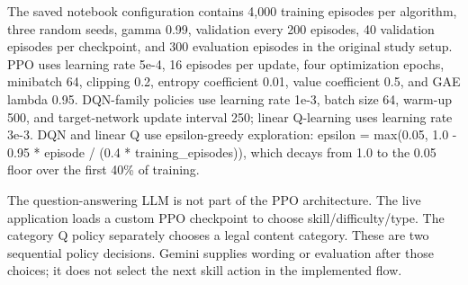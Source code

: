 \documentclass{ieeeaccess}
\begin{document}
The saved notebook configuration contains 4,000 training episodes per algorithm, three random seeds, gamma 0.99, validation every 200 episodes, 40 validation episodes per checkpoint, and 300 evaluation episodes in the original study setup. PPO uses learning rate 5e-4, 16 episodes per update, four optimization epochs, minibatch 64, clipping 0.2, entropy coefficient 0.01, value coefficient 0.5, and GAE lambda 0.95. DQN-family policies use learning rate 1e-3, batch size 64, warm-up 500, and target-network update interval 250; linear Q-learning uses learning rate 3e-3. DQN and linear Q use epsilon-greedy exploration: epsilon = max(0.05, 1.0 - 0.95 * episode / (0.4 * training\_episodes)), which decays from 1.0 to the 0.05 floor over the first 40\% of training.

The question-answering LLM is not part of the PPO architecture. The live application loads a custom PPO checkpoint to choose skill/difficulty/type. The category Q policy separately chooses a legal content category. These are two sequential policy decisions. Gemini supplies wording or evaluation after those choices; it does not select the next skill action in the implemented flow.
\end{document}
